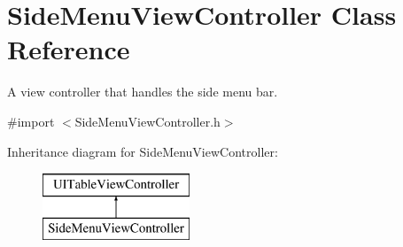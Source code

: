 \hypertarget{interface_side_menu_view_controller}{\section{Side\-Menu\-View\-Controller Class Reference}
\label{interface_side_menu_view_controller}
}


A view controller that handles the side menu bar.  




{\ttfamily \#import $<$Side\-Menu\-View\-Controller.\-h$>$}

Inheritance diagram for Side\-Menu\-View\-Controller\-:\begin{figure}[H]
\begin{center}
\leavevmode
\includegraphics[height=2.000000cm]{interface_side_menu_view_controller}
\end{center}
\end{figure}
